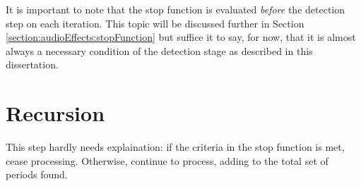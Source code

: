 It is important to note that the stop function is evaluated \emph{before} the detection step on each iteration. This topic will be discussed further in Section \ref{section:audioEffects:stopFunction} but suffice it to say, for now, that it is almost always a necessary condition of the detection stage as described in this dissertation.
\section{Recursion}\label{section:detection:recursion}
This step hardly needs explaination: if the criteria in the stop function is met, cease processing. Otherwise, continue to process, adding to the total set of periods found.


%
%
%



